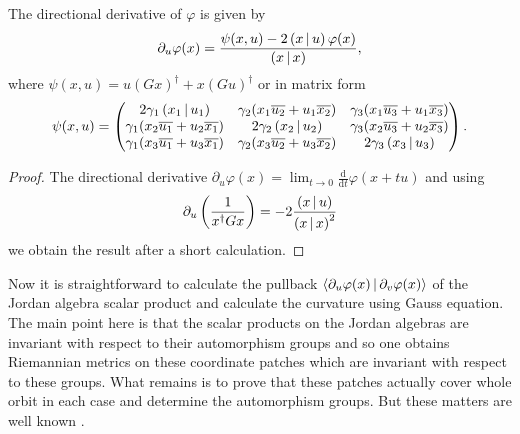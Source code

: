 \begin{lemma}
The  directional derivative of $\varphi$ is given by 
\[
\partial_u \varphi(x) = \frac{\psi(x,u) - 2\left( x \,|\, u \right)\varphi(x)}{\left( x \,|\, x \right)},
\]
where $\psi(x,u) = u(Gx)^\dagger + x(Gu)^\dagger$ or in matrix form
\[
\psi(x,u) =
\begin{pmatrix}
2\gamma_1\left( x_1 \,|\, u_1 \right) & \gamma_2(x_1\overline{u_2} + u_1\overline{x_2}) & \gamma_3(x_1\overline{u_3} + u_1\overline{x_3})  \\
\gamma_1(x_2\overline{u_1} + u_2\overline{x_1}) & 2\gamma_2\left( x_2 \,|\, u_2 \right) & \gamma_3(x_2\overline{u_3} + u_2\overline{x_3})  \\
\gamma_1(x_3\overline{u_1} + u_3\overline{x_1}) & \gamma_2(x_3\overline{u_2} + u_3\overline{x_2}) & 2\gamma_3\left( x_3 \,|\, u_3 \right)
\end{pmatrix}.
\]
\end{lemma}
\begin{proof}
The directional derivative $\partial_u \varphi(x) = \lim_{t\to 0} \frac{\mathrm{d}}{\mathrm{d}t} \varphi(x+tu)$ and using  
\[
\partial_u \left( \frac{1}{x^\dagger G x} \right) = - 2\frac{\left( x \,|\, u \right)}{\left( x \,|\, x \right)^2}
\]
we obtain the result after a short calculation.
\end{proof}

Now it is straightforward to calculate the pullback $\langle \partial_u \varphi(x)\,|\, \partial_v \varphi(x) \rangle$ of the Jordan algebra scalar product  and calculate the curvature using Gauss equation. The main point here is that the scalar products on the Jordan algebras are invariant with respect to their automorphism groups and so one obtains Riemannian metrics on these coordinate patches which are invariant with respect to these groups. What remains is to prove that these patches actually cover whole orbit in each case and determine the automorphism groups. But these matters are well known \cite{springer_octonions_2000, yokota}.

